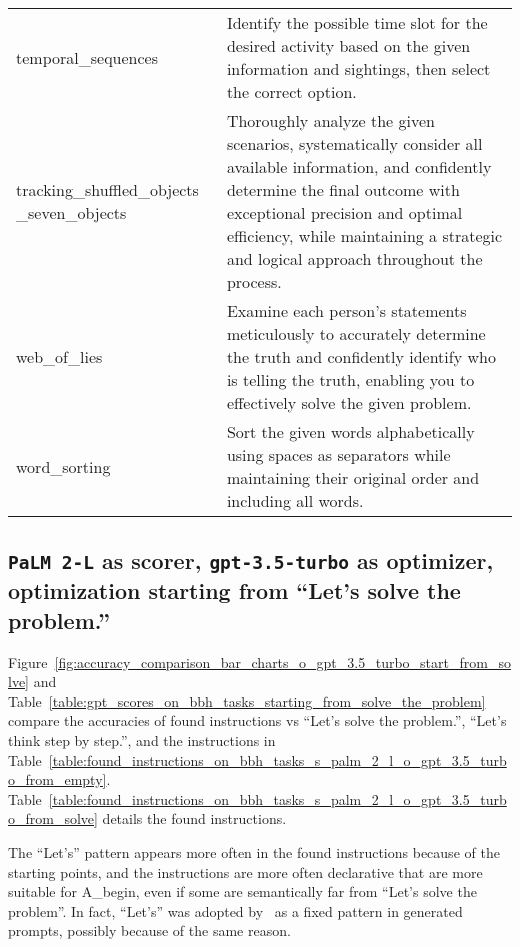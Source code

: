 \begin{table}[H]
\begin{center}
\begin{tabular}{P{2.3cm}P{11.6cm}}
temporal\_sequences & Identify the possible time slot for the desired activity based on the given information and sightings, then select the correct option. \\ [2ex]
tracking\_shuffled\_objects \_seven\_objects & Thoroughly analyze the given scenarios, systematically consider all available information, and confidently determine the final outcome with exceptional precision and optimal efficiency, while maintaining a strategic and logical approach throughout the process. \\ [2ex]
web\_of\_lies & Examine each person's statements meticulously to accurately determine the truth and confidently identify who is telling the truth, enabling you to effectively solve the given problem. \\ [2ex]
word\_sorting & Sort the given words alphabetically using spaces as separators while maintaining their original order and including all words. \\ [2ex]

\bottomrule
\end{tabular}
\end{center}
\label{table:found_instructions_on_bbh_tasks_s_text_bison_o_gpt_3.5_turbo_from_empty_q_end}
\end{table}

\newpage
\subsection{\texttt{PaLM 2-L} as scorer, \texttt{gpt-3.5-turbo} as optimizer, optimization starting from ``Let's solve the problem.''}
\label{appsec:bbh_taskwise_detailed_results_gpt_3.5_turbo_optimizer_start_from_solve}

Figure~\ref{fig:accuracy_comparison_bar_charts_o_gpt_3.5_turbo_start_from_solve} and Table~\ref{table:gpt_scores_on_bbh_tasks_starting_from_solve_the_problem} compare the accuracies of found instructions vs ``Let's solve the problem.'', ``Let's think step by step.'', and the instructions in Table~\ref{table:found_instructions_on_bbh_tasks_s_palm_2_l_o_gpt_3.5_turbo_from_empty}.
Table~\ref{table:found_instructions_on_bbh_tasks_s_palm_2_l_o_gpt_3.5_turbo_from_solve} details the found instructions.

The ``Let's'' pattern appears more often in the found instructions because of the starting points, and the instructions are more often declarative that are more suitable for A\_begin, even if some are semantically far from ``Let's solve the problem''.
In fact, ``Let's'' was adopted by~\citet{zhou2022large} as a fixed pattern in generated prompts, possibly because of the same reason.

